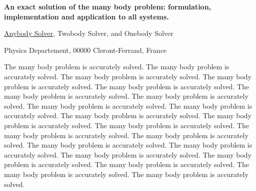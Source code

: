\documentclass[12pt]{article}
\begin{document}
\vspace{1.5cm}
\begin{center}
\bf \large
An exact solution of the many  body problem: formulation, implementation and application to all systems.
\end{center}
\vspace{1cm}
\begin{center}
\underline{Anybody Solver}, Twobody Solver, and Onebody Solver
\end{center}

Physics Departement,  00000 Cleront-Ferrand, France

\vspace{2cm}


The many body problem is accurately solved.
The many body problem is accurately solved.
The many body problem is accurately solved.
The many body problem is accurately solved.
The many body problem is accurately solved.
The many body problem is accurately solved.
The many body problem is accurately solved.
The many body problem is accurately solved.
The many body problem is accurately solved.
The many body problem is accurately solved.
The many body problem is accurately solved.
The many body problem is accurately solved.
The many body problem is accurately solved.
The many body problem is accurately solved.
The many body problem is accurately solved.
The many body problem is accurately solved.
The many body problem is accurately solved.
The many body problem is accurately solved.
The many body problem is accurately solved.
The many body problem is accurately solved.
The many body problem is accurately solved.
\end{document}
